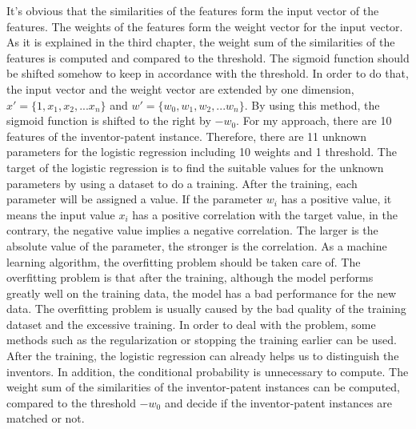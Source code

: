 It's obvious that the similarities of the features form the input vector of the features. The weights of the features form the weight vector for the input vector. As it is explained in the third chapter, the weight sum of the similarities of the features is computed and compared to the threshold. The sigmoid function should be shifted somehow to keep in accordance with the threshold. In order to do that, the input vector and the weight vector are extended by one dimension, $x'=\{1,x_1,x_2,...x_n\}$ and $w'=\{w_0,w_1,w_2,...w_n\}$. By using this method, the sigmoid function is shifted to the right by $-w_0$. For my approach, there are 10 features of  the inventor-patent instance. Therefore, there are 11 unknown parameters for the logistic regression including 10 weights and 1 threshold. The target of the logistic regression is to find the suitable values for the unknown parameters by using a dataset to do a training. After the training, each parameter will be assigned a value. If the parameter $w_i$ has a positive value, it means the input value $x_i$ has a positive correlation with the target value, in the contrary, the negative value implies a negative correlation. The larger is the absolute value of the parameter, the stronger is the correlation. As a machine learning algorithm, the overfitting problem should be taken care of. The overfitting problem is that after the training, although the model performs greatly well on the training data, the model has a bad performance for the new data. The overfitting problem is usually caused by the bad quality of the training dataset and the excessive training. In order to deal with the problem, some methods such as the regularization or stopping the training earlier can be used. After the training, the logistic regression can already helps us to distinguish the inventors. In addition, the conditional probability is unnecessary to compute. The weight sum of the similarities of the inventor-patent instances can be computed, compared to the threshold $-w_0$ and decide if the inventor-patent instances are matched or not.  
 
